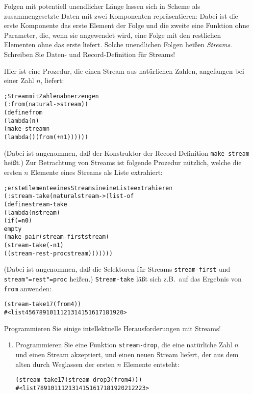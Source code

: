 \begin{aufgabe}
  Folgen mit potentiell unendlicher Länge lassen sich in Scheme als
  zusammengesetzte Daten mit zwei Komponenten repräsentieren: Dabei
  ist die erste Komponente das erste Element der Folge und die zweite
  eine Funktion ohne Parameter, die, wenn sie angewendet wird, eine Folge mit
  den restlichen Elementen ohne das erste liefert.
  Solche unendlichen Folgen heißen \textit{Streams}.
  Schreiben Sie Daten- und Record-Definition für Streams!

  Hier ist eine Prozedur, die einen Stream aus natürlichen Zahlen,
  angefangen bei einer Zahl $n$, liefert:
  \begin{alltt}
; Stream mit Zahlen ab n erzeugen
(: from (natural -> stream))
(define from
  (lambda (n)
    (make-stream n
                 (lambda () (from (+ n 1))))))
  \end{alltt}
  (Dabei ist angenommen, daß der Konstruktor der Record-Definition
  \texttt{make-stream} heißt.)
  Zur Betrachtung von Streams ist folgende Prozedur nützlich, welche
  die ersten $n$ Elemente eines Streams als Liste extrahiert:
  \begin{alltt}
; erste Elemente eines Streams in eine Liste extrahieren
(: stream-take (natural stream -> (list-of %a)))
(define stream-take
  (lambda (n stream)
    (if (= n 0)
        empty
        (make-pair (stream-first stream)
                   (stream-take (- n 1)
                                ((stream-rest-proc stream)))))))
   \end{alltt}
   (Dabei ist angenommen, daß die Selektoren für Streams
   \texttt{stream-first} und \texttt{stream"=rest"=proc} heißen.)
   \texttt{Stream-take} läßt sich z.B.\ auf das Ergebnis von
   \texttt{from} anwenden:
   \begin{alltt}
(stream-take 17 (from 4))
\evalsto{} #<list 4 5 6 7 8 9 10 11 12 13 14 15 16 17 18 19 20>
   \end{alltt}
   Programmieren Sie einige intellektuelle Herausforderungen mit Streams!
   \begin{enumerate}
   \item Programmieren Sie eine Funktion \texttt{stream-drop}, die eine
     natürliche Zahl $n$ und einen Stream akzeptiert, und einen neuen
     Stream liefert, der aus dem alten durch Weglassen der ersten $n$
     Elemente entsteht:
     \begin{alltt}
(stream-take 17 (stream-drop 3 (from 4)))
\evalsto{} #<list 7 8 9 10 11 12 13 14 15 16 17 18 19 20 21 22 23>

\end{alltt}
\end{enumerate}
\end{aufgabe}
